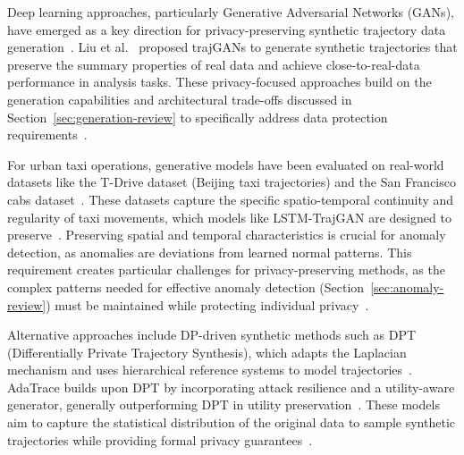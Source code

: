 Deep learning approaches, particularly Generative Adversarial Networks (GANs), have emerged as a key direction for privacy-preserving synthetic trajectory data generation~\cite{buchholzSystematisationKnowledgeTrajectory2024,liuTrajGANsUsingGenerative2018,raoLSTMTrajGANDeepLearning2020,quGenerativeAdversarialNetworks2020}. Liu et al.~\cite{liuTrajGANsUsingGenerative2018} proposed trajGANs to generate synthetic trajectories that preserve the summary properties of real data and achieve close-to-real-data performance in analysis tasks. These privacy-focused approaches build on the generation capabilities and architectural trade-offs discussed in Section~\ref{sec:generation-review} to specifically address data protection requirements~\cite{raoLSTMTrajGANDeepLearning2020,quGenerativeAdversarialNetworks2020,buchholzSystematisationKnowledgeTrajectory2024,ponomarevaHowDPfyML2023}.

For urban taxi operations, generative models have been evaluated on real-world datasets like the T-Drive dataset (Beijing taxi trajectories) and the San Francisco cabs dataset~\cite{maTrajectoryPrivacyProtection2021,primaultDifferentiallyPrivateLocation2014,primaultLongRoadComputational2019}. These datasets capture the specific spatio-temporal continuity and regularity of taxi movements, which models like LSTM-TrajGAN are designed to preserve~\cite{raoLSTMTrajGANDeepLearning2020,liuTrajGANsUsingGenerative2018,jinSurveyExperimentalStudy2023}. Preserving spatial and temporal characteristics is crucial for anomaly detection, as anomalies are deviations from learned normal patterns. This requirement creates particular challenges for privacy-preserving methods, as the complex patterns needed for effective anomaly detection (Section~\ref{sec:anomaly-review}) must be maintained while protecting individual privacy~\cite{raoLSTMTrajGANDeepLearning2020,naghizadePrivacyContextawareRelease2020}.

Alternative approaches include DP-driven synthetic methods such as DPT (Differentially Private Trajectory Synthesis), which adapts the Laplacian mechanism and uses hierarchical reference systems to model trajectories~\cite{chenDifferentiallyPrivateTrajectory2011,jinSurveyExperimentalStudy2023}. AdaTrace builds upon DPT by incorporating attack resilience and a utility-aware generator, generally outperforming DPT in utility preservation~\cite{jinSurveyExperimentalStudy2023}. These models aim to capture the statistical distribution of the original data to sample synthetic trajectories while providing formal privacy guarantees~\cite{jinSurveyExperimentalStudy2023,quGenerativeAdversarialNetworks2020}.

